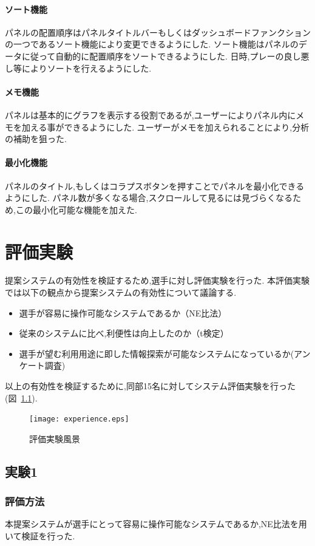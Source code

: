 \documentclass[sotsuron]{kuee}
\begin{document}
			\subsubsection{ソート機能}
			パネルの配置順序はパネルタイトルバーもしくはダッシュボードファンクションの一つであるソート機能により変更できるようにした.
			ソート機能はパネルのデータに従って自動的に配置順序をソートできるようにした.
			日時,プレーの良し悪し等によりソートを行えるようにした.
			\subsubsection{メモ機能}
			パネルは基本的にグラフを表示する役割であるが,ユーザーによりパネル内にメモを加える事ができるようにした.
			ユーザーがメモを加えられることにより,分析の補助を狙った.
			\subsubsection{最小化機能}
			パネルのタイトル,もしくはコラプスボタンを押すことでパネルを最小化できるようにした.
			パネル数が多くなる場合,スクロールして見るには見づらくなるため,この最小化可能な機能を加えた.

\chapter{評価実験}
	提案システムの有効性を検証するため,選手に対し評価実験を行った.
	本評価実験では以下の観点から提案システムの有効性について議論する.
	\begin{itemize}
		\item 選手が容易に操作可能なシステムであるか（NE比法）
		\item 従来のシステムに比べ,利便性は向上したのか（t検定）
		\item 選手が望む利用用途に即した情報探索が可能なシステムになっているか(アンケート調査)
	\end{itemize}
	以上の有効性を検証するために,同部15名に対してシステム評価実験を行った(図~\ref{fig:experi}).
		\begin{figure}
			\begin{center}
				\texttt{[image: experience.eps]}
			\end{center}
			\caption{評価実験風景}
	  		\label{fig:experi}
		\end{figure}
	\section{実験1}
		\subsection{評価方法}
			本提案システムが選手にとって容易に操作可能なシステムであるか,NE比法を用いて検証を行った.
\end{document}
